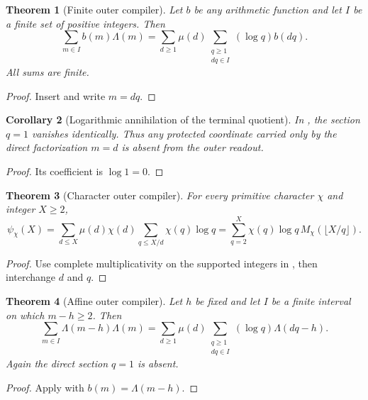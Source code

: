 \documentclass[11pt]{article}
\newtheorem{theorem}{Theorem}[section]
\newtheorem{corollary}[theorem]{Corollary}
\theoremstyle{definition}
\theoremstyle{remark}
\begin{document}
\begin{theorem}[Finite outer compiler]
\label{thm:universal-outer}
Let $b$ be any arithmetic function and let $I$ be a finite set of positive
integers.  Then
\[
 \sum_{m\in I}b(m)\Lambda(m)
 =\sum_{d\ge1}\mu(d)
   \sum_{\substack{q\ge1\\dq\in I}}(\log q)b(dq).
\]
All sums are finite.
\end{theorem}

\begin{proof}
Insert  and write $m=dq$.
\end{proof}

\begin{corollary}[Logarithmic annihilation of the terminal quotient]
\label{cor:q1-annihilation}
In , the section $q=1$ vanishes identically.  Thus
any protected coordinate carried only by the direct factorization $m=d$ is
absent from the outer readout.
\end{corollary}

\begin{proof}
Its coefficient is $\log1=0$.
\end{proof}

\begin{theorem}[Character outer compiler]
\label{thm:character-outer}
For every primitive character $\chi$ and integer $X\ge2$,
\[
 \psi_\chi(X)
 =\sum_{d\le X}\mu(d)\chi(d)
   \sum_{q\le X/d}\chi(q)\log q
 =\sum_{q=2}^{X}\chi(q)\log q\,M_\chi(\lfloor X/q\rfloor).
\]
\end{theorem}

\begin{proof}
Use complete multiplicativity on the supported integers in
, then interchange $d$ and $q$.
\end{proof}

\begin{theorem}[Affine outer compiler]
\label{thm:affine-universal-outer}
Let $h$ be fixed and let $I$ be a finite interval on which $m-h\ge2$.
Then
\[
 \sum_{m\in I}\Lambda(m-h)\Lambda(m)
 =\sum_{d\ge1}\mu(d)
   \sum_{\substack{q\ge1\\dq\in I}}
      (\log q)\Lambda(dq-h).
\]
Again the direct section $q=1$ is absent.
\end{theorem}

\begin{proof}
Apply  with $b(m)=\Lambda(m-h)$.
\end{proof}
\end{document}
